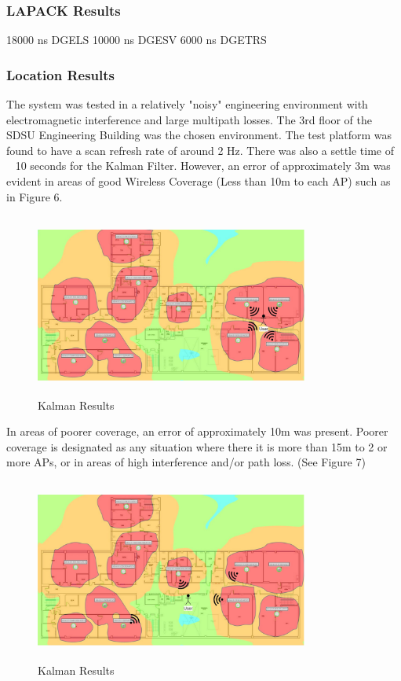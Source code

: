 \documentclass[conference]{IEEEtran}
\begin{document}
\subsubsection{LAPACK Results}
18000 ns DGELS
10000 ns DGESV
6000 ns DGETRS
\subsubsection{Location Results}
The system was tested in a relatively "noisy" engineering environment with electromagnetic interference and large multipath losses. The 3rd floor of the SDSU Engineering Building was the chosen environment. The test platform was found to have a scan refresh rate of around 2 Hz. There was also a settle time of ~ 10 seconds for the Kalman Filter. However, an error of approximately 3m was evident in areas of good Wireless Coverage (Less than 10m to each AP) such as in Figure 6.
\begin{figure}[H]
    \includegraphics[width=9.0cm,height=6cm]{Geolocation_1.jpeg}
    \caption{Kalman Results}
    \end{figure}


In areas of poorer coverage, an error of approximately 10m was present. Poorer coverage is designated as any situation where there it is more than 15m to 2 or more APs, or in areas of high interference and/or path loss. (See Figure 7)
\begin{figure}[H]
    \includegraphics[width=9.0cm,height=6cm]{Geolocation_2.jpeg}
    \caption{Kalman Results}
    \end{figure}
\end{document}
